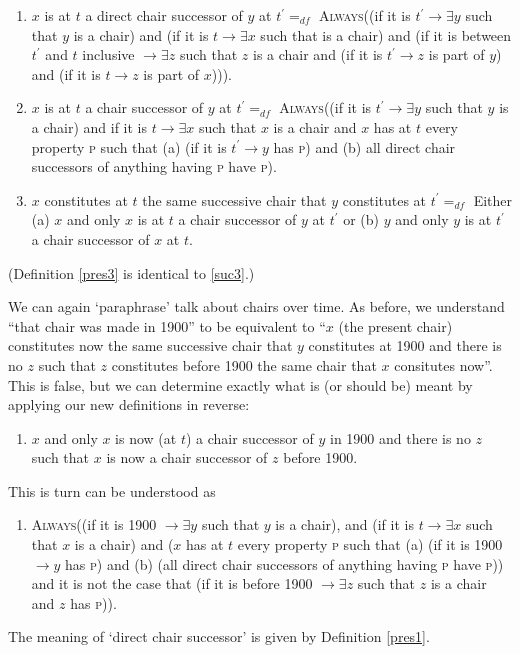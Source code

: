 \documentclass[11pt]{article}
\begin{document}
\begin{spacing}{1.5}
\begin{enumerate}[label=\arabic*a., ref=\arabic*a]
  \item $x$ is at $t$ a direct chair successor of $y$ at $t^{\prime}
    =_{df}$ \textsc{Always}((if it is $t^{\prime} \rightarrow \exists
    y$ such that $y$ is a chair) and (if it is $t \rightarrow \exists
    x$ such that is a chair) and (if it is between $t^{\prime}$ and
    $t$ inclusive $\rightarrow \exists z$ such that $z$ is a chair and
    (if it is $t^{\prime} \rightarrow z$ is part of $y$) and (if it is
    $t \rightarrow z$ is part of $x$))). \label{pres1}
  \item $x$ is at $t$ a chair successor of $y$ at $t^{\prime} =_{df}$
    \textsc{Always}((if it is $t^{\prime} \rightarrow \exists y$ such
    that $y$ is a chair) and if it is $t \rightarrow \exists x$ such
    that $x$ is a chair and $x$ has at $t$ every property \textsc{p}
    such that (a) (if it is $t^{\prime} \rightarrow y$ has \textsc{p})
    and (b) all direct chair successors of anything having \textsc{p}
    have \textsc{p}). \label{pres2}
  \item $x$ constitutes at $t$ the same successive chair that $y$
    constitutes at $t^{\prime} =_{df}$ Either (a) $x$ and only $x$ is
    at $t$ a chair successor of $y$ at $t^{\prime}$ or (b) $y$ and
    only $y$ is at $t^{\prime}$ a chair successor of $x$ at
    $t$. \label{pres3}
\end{enumerate}
(Definition \ref{pres3} is identical to \ref{suc3}.)

We can again `paraphrase' talk about chairs over time.  As before, we
understand ``that chair was made in 1900'' to be equivalent to ``$x$
(the present chair) constitutes now the same successive chair that $y$
constitutes at 1900 and there is no $z$ such that $z$ constitutes
before 1900 the same chair that $x$ consitutes now''.  This is false,
but we can determine exactly what is (or should be) meant by applying
our new definitions in reverse:

\begin{enumerate}[label=3a.]
  \item $x$ and only $x$ is now (at $t$) a chair successor of $y$ in
    1900 and there is no $z$ such that $x$ is now a chair successor of
    $z$ before 1900.
\end{enumerate}
This is turn can be understood as

\begin{enumerate}[label=2a.]
  \item \textsc{Always}((if it is 1900 $\rightarrow \exists y$ such
    that $y$ is a chair), and (if it is $t \rightarrow \exists x$ such
    that $x$ is a chair) and ($x$ has at $t$ every property \textsc{p}
    such that (a) (if it is 1900 $\rightarrow y$ has \textsc{p}) and
    (b) (all direct chair successors of anything having \textsc{p}
    have \textsc{p})) and it is not the case that (if it is before
    1900 $\rightarrow \exists z$ such that $z$ is a chair and $z$ has
    \textsc{p})).
\end{enumerate}
The meaning of `direct chair successor' is given by Definition
\ref{pres1}.


\end{spacing}
\end{document}
